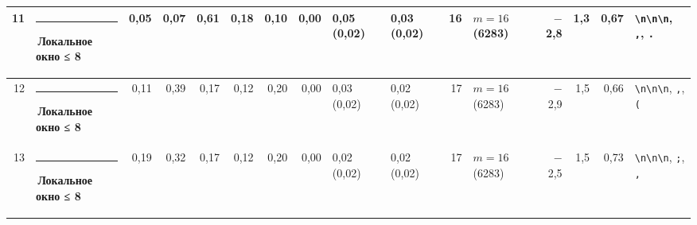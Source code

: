 \documentclass[10pt]{article}
\begin{document}
\begin{minipage}{\linewidth}
\begin{center}
{\begin{tabular}{|r|l|r|r|r|r|r|r|l|l|r|l|r|r|r|l|}
11 & \textcolor[HTML]{1BAF7A}{\rule{0.62em}{0.62em}}\,\textbf{Локальное окно ≤ 8} & 0,05 & 0,07 & 0,61 & 0,18 & 0,10 & 0,00 & 0,05 (0,02) & 0,03 (0,02) & 16 & $m{=}16$ (6283) & $-$2,8 & 1,3 & 0,67 & \texttt{\textvisiblespace{}\textbackslash{}n\textbackslash{}n\textbackslash{}n}, \texttt{\textvisiblespace{},}, \texttt{\textvisiblespace{}.} \\ \hline
12 & \textcolor[HTML]{1BAF7A}{\rule{0.62em}{0.62em}}\,\textbf{Локальное окно ≤ 8} & 0,11 & 0,39 & 0,17 & 0,12 & 0,20 & 0,00 & 0,03 (0,02) & 0,02 (0,02) & 17 & $m{=}16$ (6283) & $-$2,9 & 1,5 & 0,66 & \texttt{\textvisiblespace{}\textbackslash{}n\textbackslash{}n\textbackslash{}n}, \texttt{\textvisiblespace{},}, \texttt{\textvisiblespace{}(} \\ \hline
13 & \textcolor[HTML]{1BAF7A}{\rule{0.62em}{0.62em}}\,\textbf{Локальное окно ≤ 8} & 0,19 & 0,32 & 0,17 & 0,12 & 0,20 & 0,00 & 0,02 (0,02) & 0,02 (0,02) & 17 & $m{=}16$ (6283) & $-$2,5 & 1,5 & 0,73 & \texttt{\textvisiblespace{}\textbackslash{}n\textbackslash{}n\textbackslash{}n}, \texttt{\textvisiblespace{};}, \texttt{\textvisiblespace{},} \\ \hline
\hline\end{tabular}}\end{center}
\end{minipage}
\par\vspace{0.4em}
\end{document}

